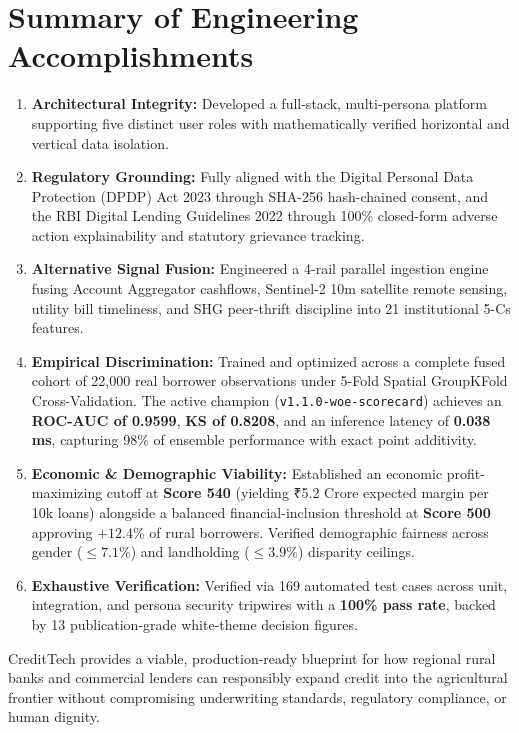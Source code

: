 \documentclass[11pt,a4paper,oneside]{report}
\begin{document}
\section{Summary of Engineering Accomplishments}
\begin{enumerate}
  \item \textbf{Architectural Integrity:} Developed a full-stack, multi-persona platform supporting five distinct user roles with mathematically verified horizontal and vertical data isolation.
  \item \textbf{Regulatory Grounding:} Fully aligned with the Digital Personal Data Protection (DPDP) Act 2023 through SHA-256 hash-chained consent, and the RBI Digital Lending Guidelines 2022 through 100\% closed-form adverse action explainability and statutory grievance tracking.
  \item \textbf{Alternative Signal Fusion:} Engineered a 4-rail parallel ingestion engine fusing Account Aggregator cashflows, Sentinel-2 10m satellite remote sensing, utility bill timeliness, and SHG peer-thrift discipline into 21 institutional 5-Cs features.
  \item \textbf{Empirical Discrimination:} Trained and optimized across a complete fused cohort of 22,000 real borrower observations under 5-Fold Spatial GroupKFold Cross-Validation. The active champion (\texttt{v1.1.0-woe-scorecard}) achieves an \textbf{ROC-AUC of 0.9599}, \textbf{KS of 0.8208}, and an inference latency of \textbf{0.038\,ms}, capturing 98\% of ensemble performance with exact point additivity.
  \item \textbf{Economic \& Demographic Viability:} Established an economic profit-maximizing cutoff at \textbf{Score 540} (yielding ₹5.2 Crore expected margin per 10k loans) alongside a balanced financial-inclusion threshold at \textbf{Score 500} approving $+12.4\%$ of rural borrowers. Verified demographic fairness across gender ($\le 7.1\%$) and landholding ($\le 3.9\%$) disparity ceilings.
  \item \textbf{Exhaustive Verification:} Verified via 169 automated test cases across unit, integration, and persona security tripwires with a \textbf{100\% pass rate}, backed by 13 publication-grade white-theme decision figures.
\end{enumerate}

CreditTech provides a viable, production-ready blueprint for how regional rural banks and commercial lenders can responsibly expand credit into the agricultural frontier without compromising underwriting standards, regulatory compliance, or human dignity.
\end{document}
